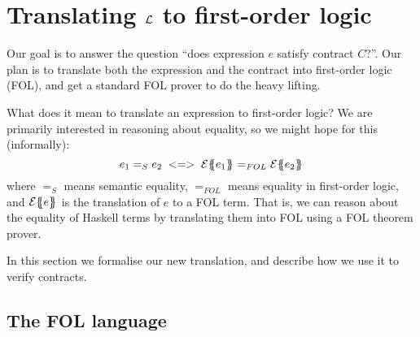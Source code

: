\section{Translating $\cal L$ to first-order logic} \label{ssect:denot-fol}

Our goal is to answer the question ``does expression $e$ satisfy
contract $C$?''.  Our plan is to translate both the expression and the
contract into first-order logic (FOL), and get a standard FOL prover
to do the heavy lifting.  

What does it mean to translate an expression to first-order logic?
We are primarily interested in reasoning about equality, so we might
hope for this (informally):
$$
e_1 =_S e_2 \;<=>\; \etrans{}{}{e_1} =_{FOL} \etrans{}{}{e_2}
$$
where $=_S$ means semantic equality, $=_{FOL}$ means equality in first-order logic,
and ${\cal E}\{\!\!\{e\}\!\!\}_{}$ is the translation of $e$ to a FOL term. That is, we can 
reason about the equality of Haskell terms by translating them into FOL using
a FOL theorem prover. 

In this section we formalise our new translation, and describe how we use it to
verify contracts.

\subsection{The FOL language}

